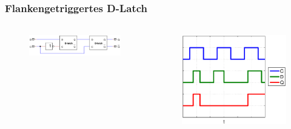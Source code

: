 \begin{frame}
    \frametitle{Flankengetriggertes D-Latch}
    \framesubtitle{}
     \begin{columns}[c]
         \begin{figure}[H]
         \begin{center}
                 \includegraphics[scale=0.25]{./img/schaltung/flanken_d.png}
         \end{center}
         \end{figure}
         \begin{figure}[H]
         \begin{center}
                 \includegraphics[scale=0.3]{./img/Aufgabe_3_d.eps}
         \end{center}
         \end{figure}
     \end{columns}
\end{frame}
